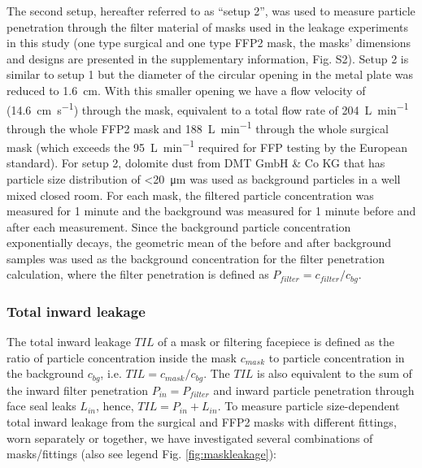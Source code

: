 \documentclass[preprint]{elsarticle}
\begin{document}
The second setup, hereafter referred to as \enquote{setup 2}, was used to measure particle penetration through the filter material of masks used in the leakage experiments in this study (one type surgical and one type FFP2 mask, the masks' dimensions and designs are presented in the supplementary information, Fig. S2). Setup 2 is similar to setup 1 but the diameter of the circular opening in the metal plate was reduced to \SI{1.6}{\centi\meter}. With this smaller opening we have a flow velocity of (\SI{14.6}{\centi \meter \per \second}) through the mask, equivalent to a total flow rate of \SI{204}{\liter\per\minute} through the whole FFP2 mask and \SI{188}{\liter \per \minute} through the whole surgical mask (which exceeds the \SI{95}{\liter\per\minute} required for FFP testing by the European standard). For setup 2, dolomite dust from DMT GmbH \& Co KG that has particle size distribution of \textless \SI{20}{\micro \meter} was used as background particles in a well mixed closed room. For each mask, the filtered particle concentration was measured for 1 minute and the background was measured for 1 minute before and after each measurement. Since the background particle concentration exponentially decays, the geometric mean of the before and after background samples was used as the background concentration for the filter penetration calculation,
where the filter penetration is defined as $P_{filter}=c_{filter}/c_{bg}$.

\subsubsection{Total inward leakage}
\label{sec:til_methods}
The total inward leakage $TIL$ of a mask or filtering facepiece is defined as the ratio of particle concentration inside the mask $c_{mask}$ to particle concentration in the background $c_{bg}$, i.e. $TIL=c_{mask}/c_{bg}$.
The $TIL$ is also equivalent to the sum of the inward filter penetration $P_{in}=P_{filter}$ and inward particle penetration through face seal leaks $L_{in}$, hence, $TIL=P_{in}+L_{in}$.
To measure particle size-dependent total inward leakage from the surgical and FFP2 masks with different fittings, worn separately or together, we have investigated several combinations of masks/fittings (also see legend Fig. \ref{fig:maskleakage}):
\end{document}

